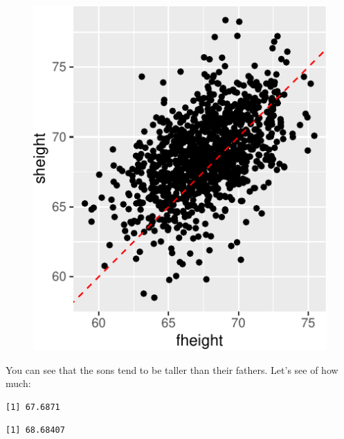 \documentclass[
  letterpaper,
  DIV=11,
  numbers=noendperiod]{scrreprt}
\newenvironment{Shaded}{\begin{snugshade}}{\end{snugshade}}
\newcommand{\FunctionTok}[1]{\textcolor[rgb]{0.28,0.35,0.67}{#1}}
\newcommand{\NormalTok}[1]{\textcolor[rgb]{0.00,0.23,0.31}{#1}}
\newcommand{\SpecialCharTok}[1]{\textcolor[rgb]{0.37,0.37,0.37}{#1}}
\begin{document}
\begin{figure}[H]

{\centering \includegraphics{./08-linearreg_files/figure-pdf/unnamed-chunk-3-1.pdf}

}

\end{figure}

You can see that the sons tend to be taller than their fathers. Let's
see of how much:

\begin{Shaded}
\end{Shaded}

\begin{verbatim}
[1] 67.6871
\end{verbatim}

\begin{Shaded}
\end{Shaded}

\begin{verbatim}
[1] 68.68407
\end{verbatim}
\end{document}
